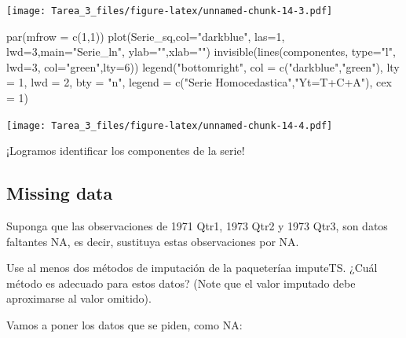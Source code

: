 \documentclass[
]{article}
\newenvironment{Shaded}{\begin{snugshade}}{\end{snugshade}}
\newcommand{\AttributeTok}[1]{\textcolor[rgb]{0.77,0.63,0.00}{#1}}
\newcommand{\DecValTok}[1]{\textcolor[rgb]{0.00,0.00,0.81}{#1}}
\newcommand{\FunctionTok}[1]{\textcolor[rgb]{0.00,0.00,0.00}{#1}}
\newcommand{\NormalTok}[1]{#1}
\newcommand{\StringTok}[1]{\textcolor[rgb]{0.31,0.60,0.02}{#1}}
\begin{document}
\texttt{[image: Tarea\_3\_files/figure-latex/unnamed-chunk-14-3.pdf]}

\begin{Shaded}
\begin{Highlighting}[]
\FunctionTok{par}\NormalTok{(}\AttributeTok{mfrow =} \FunctionTok{c}\NormalTok{(}\DecValTok{1}\NormalTok{,}\DecValTok{1}\NormalTok{))}
\FunctionTok{plot}\NormalTok{(Serie\_sq,}\AttributeTok{col=}\StringTok{"darkblue"}\NormalTok{, }\AttributeTok{las=}\DecValTok{1}\NormalTok{, }\AttributeTok{lwd=}\DecValTok{3}\NormalTok{,}\AttributeTok{main=}\StringTok{"Serie\_ln"}\NormalTok{, }\AttributeTok{ylab=}\StringTok{""}\NormalTok{,}\AttributeTok{xlab=}\StringTok{""}\NormalTok{)}
\FunctionTok{invisible}\NormalTok{(}\FunctionTok{lines}\NormalTok{(componentes, }\AttributeTok{type=}\StringTok{"l"}\NormalTok{, }\AttributeTok{lwd=}\DecValTok{3}\NormalTok{, }\AttributeTok{col=}\StringTok{"green"}\NormalTok{,}\AttributeTok{lty=}\DecValTok{6}\NormalTok{))}
\FunctionTok{legend}\NormalTok{(}\StringTok{"bottomright"}\NormalTok{, }\AttributeTok{col =} \FunctionTok{c}\NormalTok{(}\StringTok{"darkblue"}\NormalTok{,}\StringTok{"green"}\NormalTok{), }\AttributeTok{lty =} \DecValTok{1}\NormalTok{, }\AttributeTok{lwd =} \DecValTok{2}\NormalTok{, }\AttributeTok{bty =} \StringTok{"n"}\NormalTok{,}
       \AttributeTok{legend =} \FunctionTok{c}\NormalTok{(}\StringTok{"Serie Homocedastica"}\NormalTok{,}\StringTok{"Yt=T+C+A"}\NormalTok{), }\AttributeTok{cex =} \DecValTok{1}\NormalTok{)}
\end{Highlighting}
\end{Shaded}

\texttt{[image: Tarea\_3\_files/figure-latex/unnamed-chunk-14-4.pdf]}

¡Logramos identificar los componentes de la serie!

\hypertarget{missing-data}{%
\subsection{Missing data}\label{missing-data}}

Suponga que las observaciones de 1971 Qtr1, 1973 Qtr2 y 1973 Qtr3, son
datos faltantes NA, es decir, sustituya estas observaciones por NA.

Use al menos dos métodos de imputación de la paqueteríaa imputeTS. ¿Cuál
método es adecuado para estos datos? (Note que el valor imputado debe
aproximarse al valor omitido).

Vamos a poner los datos que se piden, como NA:
\end{document}
